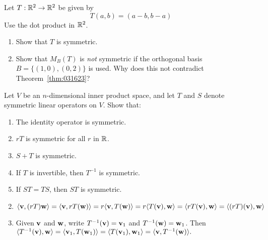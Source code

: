 \begin{multicols}{2}
\begin{ex}
\begin{enumerate}[label={\alph*.}]
\end{enumerate}
\end{ex}

\begin{ex}
Let $T : \mathbb{R}^2 \to \mathbb{R}^2$ be given by 
\begin{equation*}
T(a, b) = (a - b, b - a)
\end{equation*}
Use the dot product in $\mathbb{R}^2$.

\begin{enumerate}[label={\alph*.}]
\item Show that $T$ is symmetric.

\item Show that $M_{B}(T)$ is \textit{not} symmetric if the orthogonal basis $B = \{(1, 0), (0, 2)\}$ is used. Why does this not contradict Theorem~\ref{thm:031623}?

\end{enumerate}
\end{ex}

\begin{ex}
Let $V$ be an $n$-dimensional inner product space, and let $T$ and $S$ denote symmetric linear operators on $V$. Show that:

\begin{enumerate}[label={\alph*.}]
\item The identity operator is symmetric.

\item $rT$ is symmetric for all $r$ in $\mathbb{R}$.

\item $S + T$ is symmetric.

\item If $T$ is invertible, then $T^{-1}$ is symmetric. 

\item If $ST = TS$, then $ST$ is symmetric.

\end{enumerate}
\begin{sol}
\begin{enumerate}[label={\alph*.}]
\setcounter{enumi}{1}
\item 
$ \langle \textbf{v}, (rT)\textbf{w} \rangle = \langle \textbf{v}, rT(\textbf{w}) \rangle = r \langle \textbf{v}, T(\textbf{w}) \rangle = r \langle T(\textbf{v}), \textbf{w} \rangle= \langle rT(\textbf{v}), \textbf{w} \rangle = \langle (rT)(\textbf{v}), \textbf{w} \rangle$

\setcounter{enumi}{3}
\item Given $\textbf{v}$ and $\textbf{w}$, write $T^{-1}(\textbf{v}) = \textbf{v}_1$ and $ T^{-1}(\textbf{w}) = \textbf{w}_1 $. Then $\langle T^{-1} (\textbf{v}), \textbf{w} \rangle = 
\langle\textbf{v}_1, T(\textbf{w}_1) \rangle = \langle T(\textbf{v}_1), \textbf{w}_1 \rangle = \langle
\textbf{v}, T^{-1}(\textbf{w}) \rangle.$


\end{enumerate}
\end{sol}
\end{ex}
\end{multicols}
